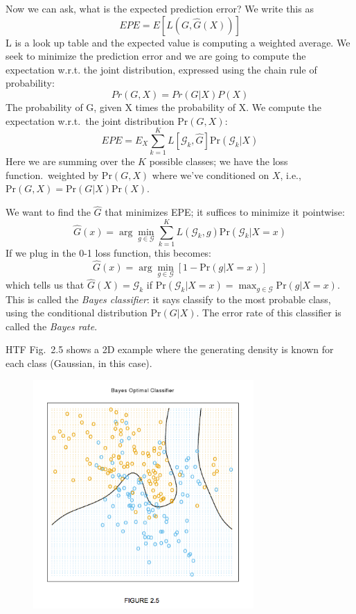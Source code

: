 \documentclass[a4paper]{article}
\begin{document}
Now we can ask, what is the expected prediction error?  We write this as
$$EPE=E[L(G,{\hat G}(X))]$$
L is a look up table and the expected value is computing a weighted average.
We seek to minimize the prediction error and we are going to compute the expectation w.r.t. the joint distribution, expressed using the chain rule of probability:
$$ Pr(G, X) = Pr (G | X) P(X)$$
The probability of G, given X times the probability of X.
We compute the expectation w.r.t.\ the joint distribution $\text{Pr}(G,X)$:
$$EPE=E_X\sum_{k=1}^K L[\mathcal{G}_k,{\hat G}]\text{Pr}(\mathcal{G}_k|X)$$
Here we are summing over the $K$ possible classes; we have the loss function.\ weighted by $\text{Pr}(G,X)$ where we've conditioned on $X$, i.e., $\text{Pr}(G,X)=\text{Pr}(G|X)\text{Pr}(X)$.

We want to find the $\hat G$ that minimizes EPE; it suffices to minimize it pointwise:
$${\hat G}(x) = \arg \min_{g\in\mathcal{G}}\sum_{k=1}^K L(\mathcal{G}_k,g)\text{Pr}(\mathcal{G}_k|X=x)$$
If we plug in the 0-1 loss function, this becomes:
$${\hat G}(x) = \arg \min_{g\in\mathcal{G}}[1-\text{Pr}(g|X=x)]$$
which tells us that ${\hat G}(X)=\mathcal{G}_k$ if $\text{Pr}(\mathcal{G}_k|X=x)=\max_{g\in\mathcal{G}}\text{Pr}(g|X=x)$.
This is called the \emph{Bayes classifier}: it says classify to the most probable class, using the conditional distribution $\text{Pr}(G|X)$.  The error rate of this classifier is called the \emph{Bayes rate}.

HTF Fig.\ 2.5 shows a 2D example where the generating density is known for each class (Gaussian, in this case).

\begin{figure}
\centering
\includegraphics[width=0.75\textwidth]{HTFfig2_5.png}
\end{figure}
\end{document}
